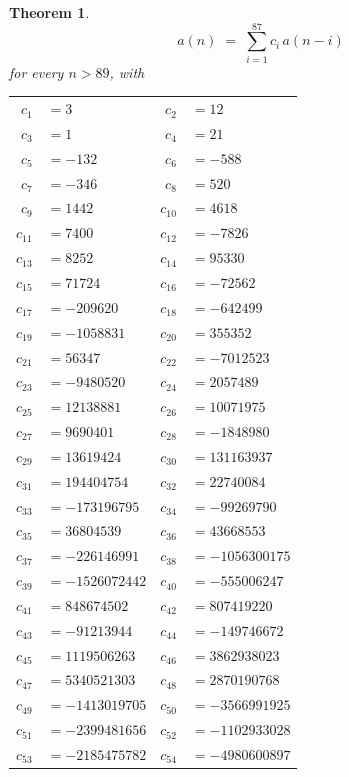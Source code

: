 \documentclass[11pt,a4paper]{article}
\theoremstyle{plain}
\newtheorem{theorem}{Theorem}
\theoremstyle{definition}
\begin{document}
\begin{theorem}
\[
a(n)\;=\;\sum_{i=1}^{87}c_i\,a(n-i)
\]
for every $n>89$, with
\begin{center}\footnotesize
\begin{tabular}{r@{\,}l@{\qquad}r@{\,}l}
$c_{1}$ & $=3$ & $c_{2}$ & $=12$ \\
$c_{3}$ & $=1$ & $c_{4}$ & $=21$ \\
$c_{5}$ & $=-132$ & $c_{6}$ & $=-588$ \\
$c_{7}$ & $=-346$ & $c_{8}$ & $=520$ \\
$c_{9}$ & $=1442$ & $c_{10}$ & $=4618$ \\
$c_{11}$ & $=7400$ & $c_{12}$ & $=-7826$ \\
$c_{13}$ & $=8252$ & $c_{14}$ & $=95330$ \\
$c_{15}$ & $=71724$ & $c_{16}$ & $=-72562$ \\
$c_{17}$ & $=-209620$ & $c_{18}$ & $=-642499$ \\
$c_{19}$ & $=-1058831$ & $c_{20}$ & $=355352$ \\
$c_{21}$ & $=56347$ & $c_{22}$ & $=-7012523$ \\
$c_{23}$ & $=-9480520$ & $c_{24}$ & $=2057489$ \\
$c_{25}$ & $=12138881$ & $c_{26}$ & $=10071975$ \\
$c_{27}$ & $=9690401$ & $c_{28}$ & $=-1848980$ \\
$c_{29}$ & $=13619424$ & $c_{30}$ & $=131163937$ \\
$c_{31}$ & $=194404754$ & $c_{32}$ & $=22740084$ \\
$c_{33}$ & $=-173196795$ & $c_{34}$ & $=-99269790$ \\
$c_{35}$ & $=36804539$ & $c_{36}$ & $=43668553$ \\
$c_{37}$ & $=-226146991$ & $c_{38}$ & $=-1056300175$ \\
$c_{39}$ & $=-1526072442$ & $c_{40}$ & $=-555006247$ \\
$c_{41}$ & $=848674502$ & $c_{42}$ & $=807419220$ \\
$c_{43}$ & $=-91213944$ & $c_{44}$ & $=-149746672$ \\
$c_{45}$ & $=1119506263$ & $c_{46}$ & $=3862938023$ \\
$c_{47}$ & $=5340521303$ & $c_{48}$ & $=2870190768$ \\
$c_{49}$ & $=-1413019705$ & $c_{50}$ & $=-3566991925$ \\
$c_{51}$ & $=-2399481656$ & $c_{52}$ & $=-1102933028$ \\
$c_{53}$ & $=-2185475782$ & $c_{54}$ & $=-4980600897$ \\

\end{tabular}
\end{center}
\end{theorem}
\end{document}
